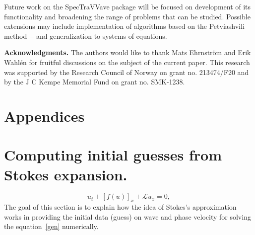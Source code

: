 Future work on the \textsf{SpecTraVVave} package will be focused on development of its functionality and broadening the range of problems that can be studied. Possible extensions may include implementation of algorithms based on the Petviashvili method~\cite{Duran2014CNSNS}--\cite{Duran2014JCAM} and generalization to systems of equations.



\textbf{Acknowledgments.}
The authors would like to thank Mats Ehrnström and Erik Wahlén
for fruitful discussions on the subject of the current paper. 
This research was supported by the Research Council of Norway on grant no. 213474/F20
and by the J C Kempe Memorial Fund on grant no. SMK-1238.







\appendix
\section*{Appendices}


\section{Computing initial guesses from Stokes expansion.}
\label{sec:stokes}

\begin{equation}
u_t+\left[f(u)\right]_{x} + \mathcal{L}u_x=0, \label{gen}
\end{equation}
	 The goal of this section is to explain how the idea of Stokes's approximation works in providing the initial data (guess) on wave and phase velocity for solving the equation~\eqref{gen} numerically.

